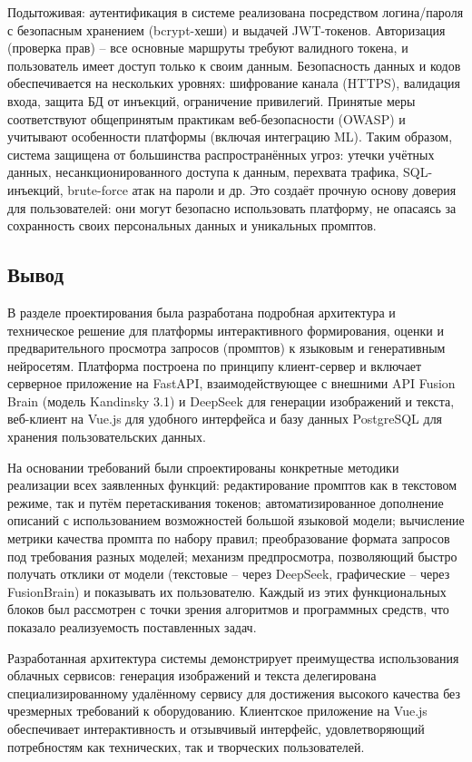 Подытоживая: аутентификация в системе реализована посредством логина/пароля с безопасным хранением (bcrypt-хеши) и выдачей JWT-токенов. Авторизация (проверка прав) – все основные маршруты требуют валидного токена, и пользователь имеет доступ только к своим данным. Безопасность данных и кодов обеспечивается на нескольких уровнях: шифрование канала (HTTPS), валидация входа, защита БД от инъекций, ограничение привилегий. Принятые меры соответствуют общепринятым практикам веб-безопасности (OWASP) и учитывают особенности платформы (включая интеграцию ML). Таким образом, система защищена от большинства распространённых угроз: утечки учётных данных, несанкционированного доступа к данным, перехвата трафика, SQL-инъекций, brute-force атак на пароли и др. Это создаёт прочную основу доверия для пользователей: они могут безопасно использовать платформу, не опасаясь за сохранность своих персональных данных и уникальных промптов.
\subsection{Вывод}
В разделе проектирования была разработана подробная архитектура и техническое решение для платформы интерактивного формирования, оценки и предварительного просмотра запросов (промптов) к языковым и генеративным нейросетям. Платформа построена по принципу клиент-сервер и включает серверное приложение на FastAPI, взаимодействующее с внешними API Fusion Brain (модель Kandinsky 3.1) и DeepSeek для генерации изображений и текста, веб-клиент на Vue.js для удобного интерфейса и базу данных PostgreSQL для хранения пользовательских данных.

На основании требований были спроектированы конкретные методики реализации всех заявленных функций: редактирование промптов как в текстовом режиме, так и путём перетаскивания токенов; автоматизированное дополнение описаний с использованием возможностей большой языковой модели; вычисление метрики качества промпта по набору правил; преобразование формата запросов под требования разных моделей; механизм предпросмотра, позволяющий быстро получать отклики от модели (текстовые – через DeepSeek, графические – через FusionBrain) и показывать их пользователю. Каждый из этих функциональных блоков был рассмотрен с точки зрения алгоритмов и программных средств, что показало реализуемость поставленных задач.

Разработанная архитектура системы демонстрирует преимущества использования облачных сервисов: генерация изображений и текста делегирована специализированному удалённому сервису для достижения высокого качества без чрезмерных требований к оборудованию. Клиентское приложение на Vue.js обеспечивает интерактивность и отзывчивый интерфейс, удовлетворяющий потребностям как технических, так и творческих пользователей.

